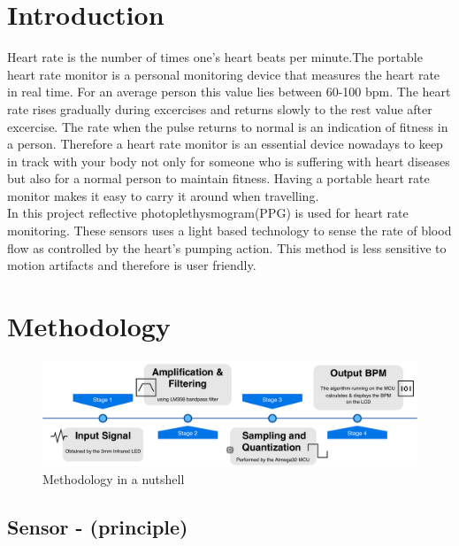 \documentclass[12pt]{article}
\begin{document}
\section{Introduction}
Heart rate is the number of times one’s heart beats per minute.The portable heart rate monitor is a personal monitoring device that measures the heart rate in real time. For an average person this value lies between 60-100 bpm. The heart rate rises gradually during excercises and returns slowly to the rest value after excercise. The rate when the pulse returns to normal is an indication of fitness in a person.  Therefore a heart rate monitor is an essential device nowadays to keep in track with your body not only for someone who is suffering with heart diseases but also for a normal person to maintain fitness. Having a portable heart rate monitor makes it easy to carry it around when travelling. 
\\
In this project reflective photoplethysmogram(PPG) is used for heart rate monitoring. These sensors uses a light based technology to sense the rate of blood flow as controlled by the heart’s pumping action. This method is less sensitive to motion artifacts and therefore is user friendly.
\\









\newpage
\section{Methodology}

	\begin{figure}[!htbp]  %
		\centering
		\includegraphics[width=1\textwidth]{block_summary}
		\caption{Methodology in a nutshell}
	\end{figure}

	\subsection{Sensor - (principle)}
	
\end{document}
